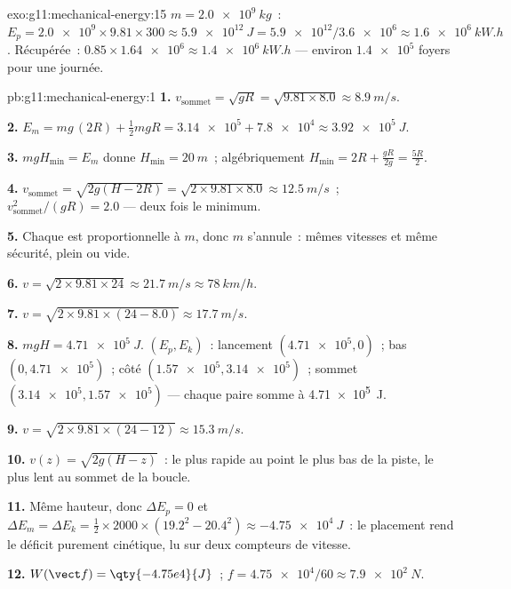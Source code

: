 \begin{solution}{exo:g11:mechanical-energy:15}
$m = \qty{2.0e9}{kg}$~:
$E_p = \num{2.0e9} \times 9.81 \times 300 \approx \qty{5.9e12}{J}
= \num{5.9e12}/\num{3.6e6} \approx \qty{1.6e6}{kW.h}$. Récupérée~:
$0.85 \times \num{1.64e6} \approx \qty{1.4e6}{kW.h}$ --- environ
$\num{1.4e5}$ foyers pour une journée.
\end{solution}

\begin{solution}{pb:g11:mechanical-energy:1}
\textbf{1.} $v_{\text{sommet}} = \sqrt{gR} = \sqrt{9.81 \times 8.0}
\approx \qty{8.9}{m/s}$.

\textbf{2.} $E_m = mg\,(2R) + \tfrac12 m gR = \num{3.14e5} +
\num{7.8e4} \approx \qty{3.92e5}{J}$.

\textbf{3.} $mgH_{\min} = E_m$ donne $H_{\min} = \qty{20}{m}$~;
algébriquement $H_{\min} = 2R + \frac{gR}{2g} = \frac{5R}{2}$.

\textbf{4.} $v_{\text{sommet}} = \sqrt{2g(H - 2R)} =
\sqrt{2 \times 9.81 \times 8.0} \approx \qty{12.5}{m/s}$~;
$v_{\text{sommet}}^2/(gR) = 2.0$ --- deux fois le minimum.

\textbf{5.} Chaque  est
proportionnelle à $m$, donc $m$ s'annule~: mêmes vitesses et même
sécurité, plein ou vide.

\textbf{6.} $v = \sqrt{2 \times 9.81 \times 24} \approx \qty{21.7}{m/s}
\approx \qty{78}{km/h}$.

\textbf{7.} $v = \sqrt{2 \times 9.81 \times (24 - 8.0)} \approx
\qty{17.7}{m/s}$.

\textbf{8.} $mgH = \qty{4.71e5}{J}$. $(E_p, E_k)$~: lancement
$(\num{4.71e5}, 0)$~; bas $(0, \num{4.71e5})$~; côté
$(\num{1.57e5}, \num{3.14e5})$~; sommet $(\num{3.14e5}, \num{1.57e5})$ ---
chaque paire somme à \qty{4.71e5}{J}.

\textbf{9.} $v = \sqrt{2 \times 9.81 \times (24 - 12)} \approx
\qty{15.3}{m/s}$.

\textbf{10.} $v(z) = \sqrt{2g(H - z)}$~: le plus rapide au point le plus
bas de la piste, le plus lent au sommet de la boucle.

\textbf{11.} Même hauteur, donc $\Delta E_p = 0$ et
$\Delta E_m = \Delta E_k = \tfrac12 \times 2000 \times (19.2^2 -
20.4^2) \approx \qty{-4.75e4}{J}$~: le placement rend le déficit purement
cinétique, lu sur deux compteurs de vitesse.

\textbf{12.} $W(\vect f) = \qty{-4.75e4}{J}$~;
$f = \num{4.75e4}/60 \approx \qty{7.9e2}{N}$.


\end{solution}
